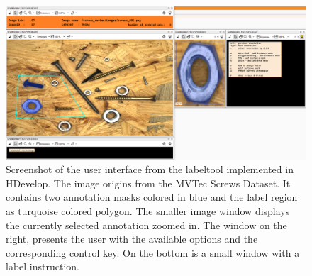 \begin{figure}
	\includegraphics[width=\linewidth]{figures/chap45_labeltool_scrennshot.png}
	\caption[Screenshot of the user interface from the labeltool]{		
		Screenshot of the user interface from the labeltool implemented in HDevelop.
		The image origins from the MVTec Screws Dataset.
		It contains two annotation masks colored in blue and the label region as turquoise colored polygon.
		The smaller image window displays the currently selected annotation zoomed in.
		The window on the right, presents the user with the available options and the corresponding control key.
		On the bottom is a small window with a label instruction.
	}
	\label{fig:ch4:sec4:labeltool}
\end{figure}
